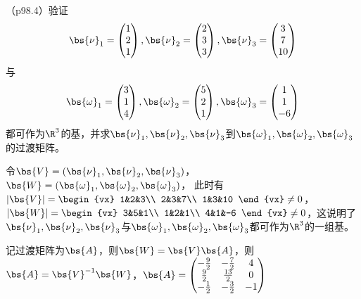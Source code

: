 \documentclass[12pt, a4paper, oneside, UTF8]{ctexbook}
\begin{document}
\begin{question}
    （p98.4）验证
    \begin{align*}
        \bs{\nu}_1=\begin{pmatrix}
            1 \\
            2\\
            1
        \end{pmatrix},\bs{\nu}_2=\begin{pmatrix}
            2\\
            3\\
            3
        \end{pmatrix},\bs{\nu}_3=\begin{pmatrix}
            3\\
            7\\
            10
        \end{pmatrix}
    \end{align*}
    与
    \begin{align*}
        \bs{\omega}_1=\begin{pmatrix}
            3 \\
            1\\
            4
        \end{pmatrix},\bs{\omega}_2=\begin{pmatrix}
            5\\
            2\\
            1
        \end{pmatrix},\bs{\omega}_3=\begin{pmatrix}
            1\\
            1\\
            -6
        \end{pmatrix}
    \end{align*}
    都可作为$\R^3$的基，并求$\bs{\nu}_1,\bs{\nu}_2,\bs{\nu}_3$到$\bs{\omega}_1,\bs{\omega}_2,\bs{\omega}_3$的过渡矩阵。
\end{question}

\begin{solution}
令$\bs{V}=(\bs{\nu}_1,\bs{\nu}_2,\bs{\nu}_3)$，$\bs{W}=(\bs{\omega}_1,\bs{\omega}_2,\bs{\omega}_3)$，
此时有$|\bs{V}|=\begin{vx}
    1&2&3\\
    2&3&7\\
    1&3&10
\end{vx} \neq 0$，$|\bs{W}|=\begin{vx}
    3&5&1\\
    1&2&1\\
    4&1&-6
\end{vx} \neq 0$，这说明了$\bs{\nu}_1,\bs{\nu}_2,\bs{\nu}_3$与$\bs{\omega}_1,\bs{\omega}_2,\bs{\omega}_3$都可作为$\R^3$的一组基。

记过渡矩阵为$\bs{A}$，则$\bs{W}=\bs{V}\bs{A}$，则$\bs{A}=\bs{V}^{-1}\bs{W}$，$\bs{A}=\begin{pmatrix}
    -\frac{9}{2}& -\frac{7}{2}&4 \\
    \frac{9}{2}& \frac{13}{2}& 0 \\
    -\frac{1}{2} &-\frac{3}{2} &-1
\end{pmatrix}$
\end{solution}
\end{document}
